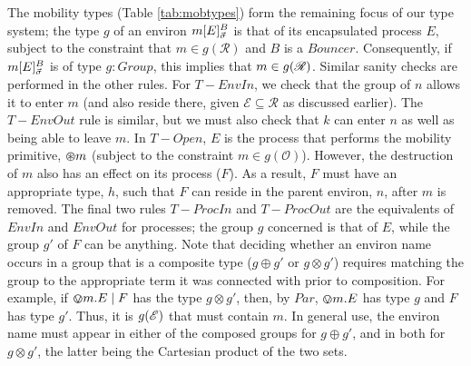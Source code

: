 The mobility types (Table \ref{tab:mobtypes}) form the remaining focus
of our type system; the type $g$ of an environ
${m}[ E ]^{B}_{\vec{\sigma}}$ is that of its encapsulated process
$E$, subject to the constraint that $m \in g(\mathscr{R})$ and $B$ is
a $Bouncer$. Consequently, if ${m}[ E ]^{B}_{\vec{\sigma}}$ is of
type $g : Group$, this implies that $m \in g(\mathscr{R})$.  Similar
sanity checks are performed in the other rules. For $T-EnvIn$, we
check that the group of $n$ allows it to enter $m$ (and also reside
there, given $\mathscr{E} \subseteq \mathscr{R}$ as discussed
earlier).  The $T-EnvOut$ rule is similar, but we must also check that
$k$ can enter $n$ as well as being able to leave $m$.  In $T-Open$,
$E$ is the process that performs the mobility primitive, $\varoast m$
(subject to the constraint $m \in g(\mathscr{O})$).  However, the
destruction of $m$ also has an effect on its process ($F$).  As a
result, $F$ must have an appropriate type, $h$, such that $F$ can
reside in the parent environ, $n$, after $m$ is removed.  The final
two rules $T-ProcIn$ and $T-ProcOut$ are the equivalents of $EnvIn$
and $EnvOut$ for processes; the group $g$ concerned is that of $E$,
while the group $g'$ of $F$ can be anything.  Note that deciding
whether an environ name occurs in a group that is a composite type ($g
\oplus g'$ or $g \otimes g'$) requires matching the group to the
appropriate term it was connected with prior to composition.  For
example, if $\varovee m.E \;|\; F$ has the type $g \otimes g'$, then, by
$Par$, $\varovee m.E$ has type $g$ and $F$ has type $g'$.  Thus, it is
$g(\mathscr{E})$ that must contain $m$.  In general use, the environ name
must appear in either of the composed groups for $g \oplus g'$, and in
both for $g \otimes g'$, the latter being the Cartesian product of the
two sets.

